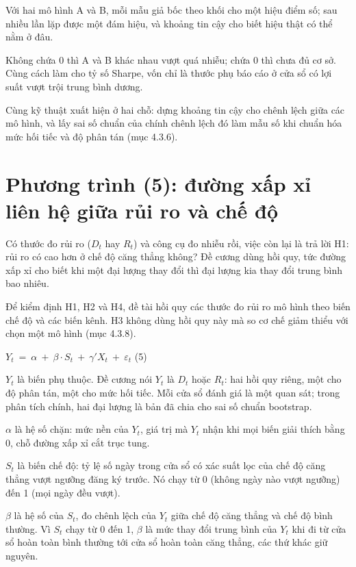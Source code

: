 Với hai mô hình A và B, mỗi mẫu giả bốc theo khối cho một hiệu điểm số; sau nhiều lần lặp được một đám hiệu, và khoảng tin cậy cho biết hiệu thật có thể nằm ở đâu.

Không chứa 0 thì A và B khác nhau vượt quá nhiễu; chứa 0 thì chưa đủ cơ sở. Cùng cách làm cho tỷ số Sharpe, vốn chỉ là thước phụ báo cáo ở cửa sổ có lợi suất vượt trội trung bình dương.

Cùng kỹ thuật xuất hiện ở hai chỗ: dựng khoảng tin cậy cho chênh lệch giữa các mô hình, và lấy sai số chuẩn của chính chênh lệch đó làm mẫu số khi chuẩn hóa mức hối tiếc và độ phân tán (mục 4.3.6).

\section{Phương trình (5): đường xấp xỉ liên hệ giữa rủi ro và chế độ}

Có thước đo rủi ro (\(D_{t}\) hay \(R_{t}\)) và công cụ đo nhiễu rồi, việc còn lại là trả lời H1: rủi ro có cao hơn ở chế độ căng thẳng không? Đề cương dùng hồi quy, tức đường xấp xỉ cho biết khi một đại lượng thay đổi thì đại lượng kia thay đổi trung bình bao nhiêu.

Để kiểm định H1, H2 và H4, đề tài hồi quy các thước đo rủi ro mô hình theo biến chế độ và các biến kênh. H3 không dùng hồi quy này mà so cơ chế giảm thiểu với chọn một mô hình (mục 4.3.8).

\(Y_{t}\  = \ \alpha\  + \ \beta \cdot S_{t}\  + \ \gamma'X_{t}\  + \ \varepsilon_{t}\) (5)

\(Y_{t}\) là biến phụ thuộc. Đề cương nói \(Y_{t}\) là \(D_{t}\) hoặc \(R_{t}\): hai hồi quy riêng, một cho độ phân tán, một cho mức hối tiếc. Mỗi cửa sổ đánh giá là một quan sát; trong phân tích chính, hai đại lượng là bản đã chia cho sai số chuẩn bootstrap.

\(\alpha\) là hệ số chặn: mức nền của \(Y_{t}\), giá trị mà \(Y_{t}\) nhận khi mọi biến giải thích bằng 0, chỗ đường xấp xỉ cắt trục tung.

\(S_{t}\) là biến chế độ: tỷ lệ số ngày trong cửa sổ có xác suất lọc của chế độ căng thẳng vượt ngưỡng đăng ký trước. Nó chạy từ 0 (không ngày nào vượt ngưỡng) đến 1 (mọi ngày đều vượt).

\(\beta\) là hệ số của \(S_{t}\), đo chênh lệch của \(Y_{t}\) giữa chế độ căng thẳng và chế độ bình thường. Vì \(S_{t}\) chạy từ 0 đến 1, \(\beta\) là mức thay đổi trung bình của \(Y_{t}\) khi đi từ cửa sổ hoàn toàn bình thường tới cửa sổ hoàn toàn căng thẳng, các thứ khác giữ nguyên.

